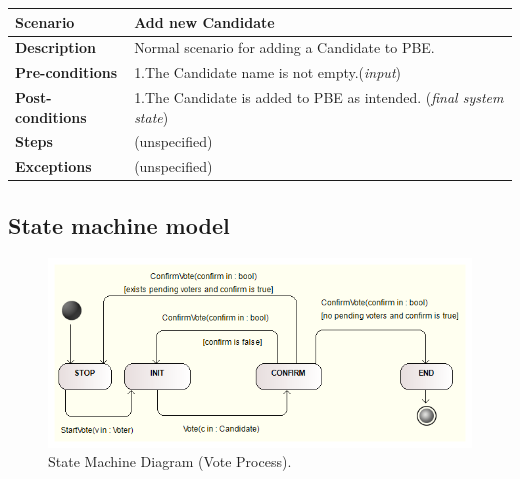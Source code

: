 \documentclass{article}
\begin{document}
\begin{center}
    \begin{tabular}{ | l | p{9cm} |}
    \hline
   \textbf{Scenario}	& \textbf{Add new Candidate }  \\ \hline
    \textbf{Description}	&Normal scenario for adding a Candidate to PBE.\\ \hline
   \textbf{Pre-conditions}	&1.The Candidate name is not empty.(\textit{input})
\\ \hline
 \textbf{Post-conditions} & 1.The Candidate is added to PBE as intended. (\textit{final system state}) \\ \hline
   \textbf{Steps} &  (unspecified)
 \\ 
    \hline
\textbf{Exceptions}& 	(unspecified)
 \\ 
    \hline
    \end{tabular}
\end{center}


\subsection{State machine model}
\begin{figure}[H]
\centering
	\includegraphics[width=\textwidth,height=\textheight,keepaspectratio]{state.png}
	\caption{State Machine Diagram (Vote Process).}
	\label{fig:PropProf}
\end{figure}
\end{document}

